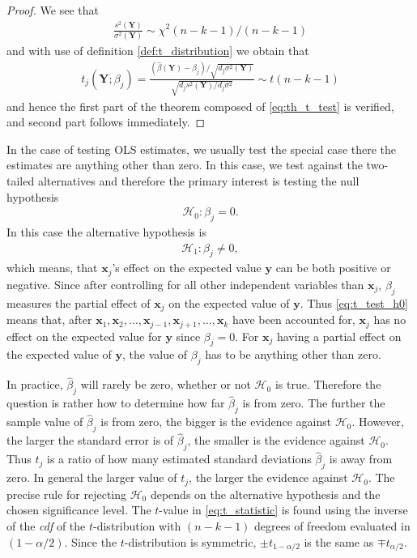 \begin{proof}
We see that
\begin{align*}
    \frac{s^2(\textbf{Y})}{\sigma^2(\textbf{Y})} \sim \chi^2(n-k-1)/(n-k-1)
\end{align*}
and with use of definition \ref{def:t_distribution} we obtain that
\begin{align*}
    t_j(\textbf{Y};\beta_j)=\frac{(\hat{\beta}(\textbf{Y})-\beta_j)/\sqrt{d_j\sigma^2(\textbf{Y})}}{\sqrt{d_js^2(\textbf{Y})/d_j\sigma^2}} \sim t(n-k-1)
\end{align*}
and hence the first part of the theorem composed of \eqref{eq:th_t_test} is verified, and second part follows immediately. 
\end{proof}

In the case of testing OLS estimates, we usually test the special case there the estimates are anything other than zero. In this case, we test against the two-tailed alternatives and therefore the primary interest is testing the null hypothesis
\begin{align} \label{eq:t_test_h0}
    \mathcal{H}_0:\beta_j=0.
\end{align}
In this case the alternative hypothesis is
\begin{align} \label{eq:t_test_ha}
    \mathcal{H}_1 : \beta_j \neq 0,
\end{align}
which means, that $\textbf{x}_j$'s effect on the expected value $\textbf{y}$ can be both positive or negative.
Since after controlling for all other independent variables than $\textbf{x}_j$, $\beta_j$ measures the partial effect of $\textbf{x}_j$ on the expected value of $\textbf{y}$. 
Thus \eqref{eq:t_test_h0} means that, after $\textbf{x}_1,\textbf{x}_2, \ldots, \textbf{x}_{j-1}, \textbf{x}_{j+1}, \ldots, \textbf{x}_k$ have been accounted for, $\textbf{x}_j$ has no effect on the expected value for $\textbf{y}$ since $\beta_j=0$. 
For $\textbf{x}_j$ having a partial effect on the expected value of $\textbf{y}$, the value of $\beta_j$ has to be anything other than zero.

In practice, $\hat{\beta}_j$ will rarely be zero, whether or not $\mathcal{H}_0$ is true.
Therefore the question is rather how to determine how far $\hat{\beta}_j$ is from zero. 
The further the sample value of $\hat{\beta}_j$ is from zero, the bigger is the evidence against $\mathcal{H}_0$. 
However, the larger the standard error is of $\hat{\beta}_j$, the smaller is the evidence against $\mathcal{H}_0$. 
Thus $t_{j}$ is a ratio of how many estimated standard deviations $\hat{\beta}_j$ is away from zero.
In general the larger value of $t_{j}$, the larger the evidence against $\mathcal{H}_0$. 
The precise rule for rejecting $\mathcal{H}_0$ depends on the alternative hypothesis and the chosen significance level.
The $t$-value in \eqref{eq:t_statistic} is found using the inverse of the \textit{cdf} of the $t$-distribution with $(n - k - 1)$ degrees of freedom evaluated in $(1-\alpha/2)$. 
Since the $t$-distribution is symmetric, $\pm t_{1-\alpha/2}$ is the same as $\mp t_{\alpha/2}$.

